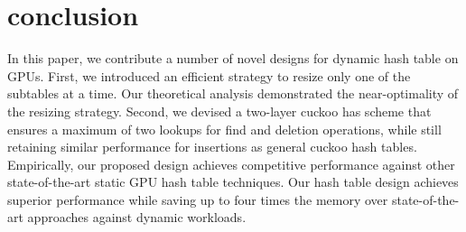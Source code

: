 \section{conclusion}\label{sec:con}
In this paper, we contribute a number of novel designs for dynamic hash table on GPUs. 
First, we introduced an efficient strategy to resize only one of the subtables at a time. Our theoretical analysis demonstrated the near-optimality of the resizing strategy. Second, we devised a two-layer cuckoo has scheme that ensures a maximum of two lookups for find and deletion operations, while still retaining similar performance for insertions as general cuckoo hash tables. 
Empirically, our proposed design achieves competitive performance against other state-of-the-art static GPU hash table techniques. Our hash table design achieves superior performance while saving up to four times the memory over state-of-the-art approaches against dynamic workloads.

 